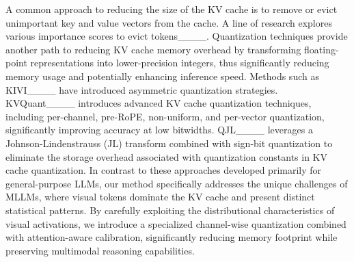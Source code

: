 A common approach to reducing the size of the KV cache is to remove or evict unimportant key and value vectors from the cache.
A line of research explores various importance scores to evict tokens____. 
Quantization techniques provide another path to reducing KV cache memory overhead by transforming floating-point representations into lower-precision integers, thus significantly reducing memory usage and potentially enhancing inference speed. Methods such as KIVI____ have introduced asymmetric quantization strategies.
KVQuant____ introduces advanced KV cache quantization techniques, including per-channel, pre-RoPE, non-uniform, and per-vector quantization, significantly improving accuracy at low bitwidths.
QJL____ leverages a Johnson-Lindenstrauss (JL) transform combined with sign-bit quantization to eliminate the storage overhead associated with quantization constants in KV cache quantization.
In contrast to these approaches developed primarily for general-purpose LLMs, our method specifically addresses the unique challenges of MLLMs, where visual tokens dominate the KV cache and present distinct statistical patterns. By carefully exploiting the distributional characteristics of visual activations, we introduce a specialized channel-wise quantization combined with attention-aware calibration, significantly reducing memory footprint while preserving multimodal reasoning capabilities.
